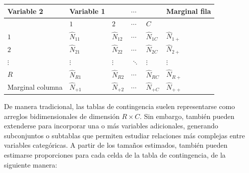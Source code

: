 \documentclass[
  spanish,
  12pt,
]{book}
\newcounter{none} %
\begin{document}
{\def\LTcaptype{none} %
\begin{longtable}[]{@{}
  >{\raggedright\arraybackslash}p{}
  >{\raggedright\arraybackslash}p{}
  >{\raggedright\arraybackslash}p{}
  >{\raggedright\arraybackslash}p{}
  >{\raggedright\arraybackslash}p{}
  >{\raggedright\arraybackslash}p{}@{}}
\toprule\noalign{}
\begin{minipage}[b]{\linewidth}\raggedright
Variable 2
\end{minipage} & \begin{minipage}[b]{\linewidth}\raggedright
Variable 1
\end{minipage} & \begin{minipage}[b]{\linewidth}\raggedright
\end{minipage} & \begin{minipage}[b]{\linewidth}\raggedright
\(\cdots\)
\end{minipage} & \begin{minipage}[b]{\linewidth}\raggedright
\end{minipage} & \begin{minipage}[b]{\linewidth}\raggedright
Marginal fila
\end{minipage} \\
\midrule\noalign{}
\endhead
\bottomrule\noalign{}
\endlastfoot
& \(1\) & \(2\) & \(\cdots\) & \(C\) & \\
\(1\) & \(\hat{N}_{11}\) & \(\hat{N}_{12}\) & \(\cdots\) & \(\hat{N}_{1C}\) & \(\hat{N}_{1+}\) \\
\(2\) & \(\hat{N}_{21}\) & \(\hat{N}_{22}\) & \(\cdots\) & \(\hat{N}_{2C}\) & \(\hat{N}_{2+}\) \\
\(\vdots\) & \(\vdots\) & \(\vdots\) & \(\ddots\) & \(\vdots\) & \(\vdots\) \\
\(R\) & \(\hat{N}_{R1}\) & \(\hat{N}_{R2}\) & \(\cdots\) & \(\hat{N}_{RC}\) & \(\hat{N}_{R+}\) \\
Marginal columna & \(\hat{N}_{+1}\) & \(\hat{N}_{+2}\) & \(\cdots\) & \(\hat{N}_{+C}\) & \(\hat{N}_{++}\) \\
\end{longtable}
}

De manera tradicional, las tablas de contingencia suelen representarse como arreglos bidimensionales de dimensión \(R \times C\). Sin embargo, también pueden extenderse para incorporar una o más variables adicionales, generando subconjuntos o subtablas que permiten estudiar relaciones más complejas entre variables categóricas. A partir de los tamaños estimados, también pueden estimarse proporciones para cada celda de la tabla de contingencia, de la siguiente manera:
\end{document}
